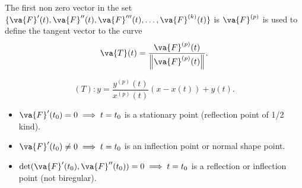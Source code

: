 The first non zero vector in the set $\{\va{F}'(t),\va{F}''(t),\va{F}'''(t),\ldots,\va{F}^{(k)}(t)\} $ is $\va{F}^{(p)}$ is used to define the tangent vector to the curve
\[
	\va{T}(t) = \frac{\va{F}^{(p)}(t)}{\left\| \va{F}^{(p)}(t) \right\| }
	.\]

\[
	(T):y=\frac{y^{(p)}(t)}{x^{(p)}(t)}(x-x(t)) + y(t)
	.\]
\begin{remark}
	\begin{itemize}
		\item $\va{F}'(t_0)=0\implies t=t_0$ is a stationary point (reflection point of 1/2 kind).
		\item $\va{F}'(t_0) \neq  0\implies t=t_0$ is an inflection point or normal shape point.
		\item $\det(\va{F}'(t_0),\va{F}''(t_0))=0\implies t=t_0$ is a reflection or inflection point (not biregular).
	\end{itemize}
\end{remark}
\newpage
